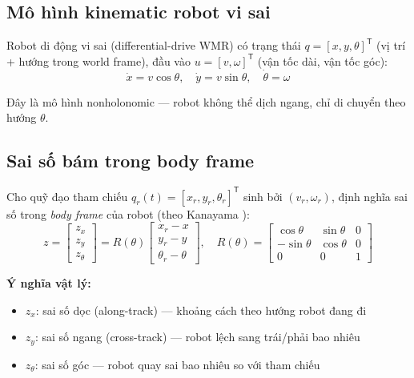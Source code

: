 \documentclass[12pt,a4paper]{article}
\newcommand{\T}{\mathsf{T}}
\begin{document}
\subsection{Mô hình kinematic robot vi sai}

Robot di động vi sai (differential-drive WMR) có trạng thái $q = [x, y, \theta]^\T$ (vị trí + hướng trong world frame), đầu vào $u = [v, \omega]^\T$ (vận tốc dài, vận tốc góc):
\begin{equation}\label{eq:kinematics}
    \dot{x} = v\cos\theta, \quad \dot{y} = v\sin\theta, \quad \dot{\theta} = \omega
\end{equation}

Đây là mô hình nonholonomic --- robot không thể dịch ngang, chỉ di chuyển theo hướng $\theta$.

\subsection{Sai số bám trong body frame}

Cho quỹ đạo tham chiếu $q_r(t) = [x_r, y_r, \theta_r]^\T$ sinh bởi $(v_r, \omega_r)$, định nghĩa sai số trong \textit{body frame} của robot (theo Kanayama \cite{Kanayama1990}):
\begin{equation}\label{eq:error_def}
    z = \begin{bmatrix} z_x \\ z_y \\ z_\theta \end{bmatrix}
    = R(\theta)
    \begin{bmatrix} x_r - x \\ y_r - y \\ \theta_r - \theta \end{bmatrix}, \quad
    R(\theta) = \begin{bmatrix}
        \cos\theta & \sin\theta & 0 \\
        -\sin\theta & \cos\theta & 0 \\
        0 & 0 & 1
    \end{bmatrix}
\end{equation}

\textbf{Ý nghĩa vật lý:}
\begin{itemize}[nosep]
    \item $z_x$: sai số dọc (along-track) --- khoảng cách theo hướng robot đang đi
    \item $z_y$: sai số ngang (cross-track) --- robot lệch sang trái/phải bao nhiêu
    \item $z_\theta$: sai số góc --- robot quay sai bao nhiêu so với tham chiếu
\end{itemize}
\end{document}
